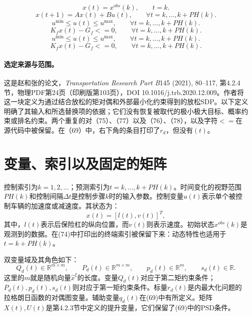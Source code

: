 \documentclass[10pt]{article}
\begin{document}
\begin{equation}
x(t)=x^{obs}(k),\qquad t=k.
\tag{73}
\end{equation}
\begin{equation}
x(t+1)=Ax(t)+Bu(t),\qquad\forall t=k,\ldots,k+PH(k).
\tag{74}
\end{equation}
\begin{equation}
u^{\min}\leq u(t)\leq u^{\max},\qquad\forall t=k,\ldots,k+PH(k).
\tag{75}
\end{equation}
\begin{equation}
K_fx(t)-G_f\mathrel{<=}0,\qquad\forall t=k,\ldots,k+PH(k).
\tag{76}
\end{equation}
\begin{equation}
u^{\min}\leq u(t)\leq u^{\max},\qquad\forall t=k,\ldots,k+PH(k).
\tag{77}
\end{equation}
\begin{equation}
K_fx(t)-G_f\mathrel{<=}0,\qquad\forall t=k,\ldots,k+PH(k).
\tag{78}
\end{equation}

\paragraph{选定来源与范围。}
这是赵和张的论文，\emph{Transportation Research Part B}145 (2021), 80--117, 第4.2.4节，物理PDF第24页（印刷版第103页），DOI 10.1016/j.trb.2020.12.009。作者将这一块定义为通过结合放松的矩对偶和外部最小化约束得到的放松SDP。以下定义明确了其输入和所选替换项的依据；它们没有恢复被取代的极小极大目标、概率约束或排名约束。两个重复的对（75）、（77）以及（76）、（78），以及字符\(<=\)在源代码中被保留。在（69）中，右下角的条目打印了\(r_d\)，但没有\((t)\)。

\section*{变量、索引以及固定的矩阵}
控制索引为\(k=1,2,\ldots\)；预测索引为\(t=k,\ldots,k+PH(k)\)。时间变化的视野范围\(PH(k)\)和控制间隔\(\Delta t\)是控制步骤\(k\)时的输入参数。控制变量\(u(t)\)表示单个被控制车辆的加速度或减速度。其状态为：
\[
x(t)=[l(t),v(t)]^T,
\]
其中，\(l(t)\)表示后保险杠的纵向位置，而\(v(t)\)则表示速度。初始状态\(x^{obs}(k)\)是观测到的数据。在(74)中打印出的终端索引被保留下来：动态特性也适用于\(t=k+PH(k)\)。

双变量域及其角色如下：
\[
Q_d(t)\in\mathbb R^{m\times m},\qquad
P_d(t)\in\mathbb R^{m\times m},\qquad
p_d(t)\in\mathbb R^m,\qquad s_d(t)\in\mathbb R.
\]
这里的\(m\)就是随机向量\(\hat x^\xi\)的长度。变量\(Q_d(t)\)对应于第二矩约束条件；\(P_d(t),p_d(t),s_d(t)\)则对应于第一矩约束条件。标量\(r_d(t)\)是内最大化问题的拉格朗日函数的对偶图变量。辅助变量\(q_d(t)\)在(69)中有所定义。矩阵\(X(t),U(t)\)是第4.2.3节中定义的提升变量，它们保留了(69)中的PSD条件。
\end{document}
